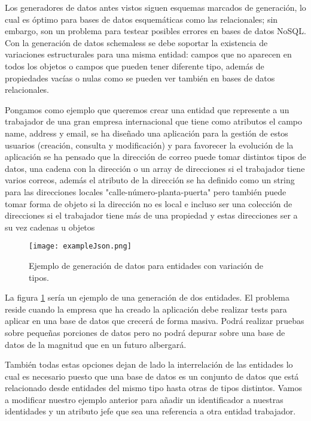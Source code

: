 Los generadores de datos antes vistos siguen esquemas marcados de generación, lo cual es óptimo para bases de datos esquemáticas como las relacionales; sin embargo, son un problema para testear posibles errores en bases de datos NoSQL. Con la generación de datos schemaless se debe soportar la existencia de variaciones estructurales para una misma entidad: campos que no aparecen en todos los objetos o campos que pueden tener diferente tipo, además de propiedades vacías o nulas como se pueden ver también en bases de datos relacionales. 

Pongamos como ejemplo que queremos crear una entidad que represente a un trabajador de una gran empresa internacional que tiene como atributos el campo name, address y email, se ha diseñado una aplicación para la gestión de estos usuarios (creación, consulta y modificación) y para favorecer la evolución de la aplicación se ha pensado que la dirección de correo puede tomar distintos tipos de datos, una cadena con la dirección o un array de direcciones si el trabajador tiene varios correos, además el atributo de la dirección se ha definido como un string para las direcciones locales "calle-número-planta-puerta" pero también puede tomar forma de objeto si la dirección no es local e incluso ser una colección de direcciones si el trabajador tiene más de una propiedad y estas direcciones ser a su vez cadenas u objetos


\begin{figure}[h!]
	\centerline{\texttt{[image: exampleJson.png]}}
	\caption{Ejemplo de generación de datos para entidades con variación de tipos.}
	\label{figure:jsonExample}
\end{figure}

La figura \ref{figure:jsonExample} sería un ejemplo de una generación de dos entidades. El problema reside cuando la empresa que ha creado la aplicación debe realizar tests para aplicar en una base de datos que crecerá de forma masiva. Podrá realizar pruebas sobre pequeñas porciones de datos pero no podrá depurar sobre una base de datos de la magnitud que en un futuro albergará.

También todas estas opciones dejan de lado la interrelación de las entidades lo cual es necesario puesto que una base de datos es un conjunto de datos que está relacionado desde entidades del mismo tipo hasta otras de tipos distintos. Vamos a modificar nuestro ejemplo anterior para añadir un identificador a nuestras identidades y un atributo jefe que sea una referencia a otra entidad trabajador.


